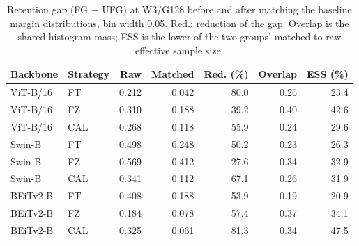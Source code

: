 \begin{table}[t]
\centering
\caption{Retention gap (FG $-$ UFG) at W3/G128 before and after matching the baseline margin distributions, bin width 0.05. Red.: reduction of the gap. Overlap is the shared histogram mass; ESS is the lower of the two groups' matched-to-raw effective sample size.}
\label{tab:margin}
\setlength{\tabcolsep}{1.6pt}
\small
\begin{tabular}{llrrrrr}
\toprule
Backbone & Strategy & Raw & Matched & Red. (\%) & Overlap & ESS (\%) \\
\midrule
ViT-B/16 & FT & 0.212 & 0.042 & 80.0 & 0.26 & 23.4 \\
ViT-B/16 & FZ & 0.310 & 0.188 & 39.2 & 0.40 & 42.6 \\
ViT-B/16 & CAL & 0.268 & 0.118 & 55.9 & 0.24 & 29.6 \\
Swin-B & FT & 0.498 & 0.248 & 50.2 & 0.23 & 26.3 \\
Swin-B & FZ & 0.569 & 0.412 & 27.6 & 0.34 & 32.9 \\
Swin-B & CAL & 0.341 & 0.112 & 67.1 & 0.26 & 31.9 \\
BEiTv2-B & FT & 0.408 & 0.188 & 53.9 & 0.19 & 20.9 \\
BEiTv2-B & FZ & 0.184 & 0.078 & 57.4 & 0.37 & 34.1 \\
BEiTv2-B & CAL & 0.325 & 0.061 & 81.3 & 0.34 & 47.5 \\
\bottomrule
\end{tabular}
\end{table}

